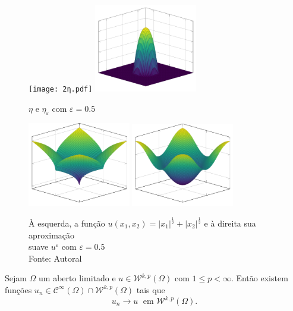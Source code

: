 \documentclass[a4paper, 11pt]{book}
\theoremstyle{definition}
\newcommand{\cC}{\mathcal{C}}
\newcommand{\cW}{\mathcal{W}}
\begin{document}
\begin{ex}
    \begin{figure}
        \centering
        \texttt{[image: 2η.pdf]}
        \hspace{10mm}
        \includegraphics[width=0.4\textwidth]{2ηε.pdf}
        \caption{$\eta$ e $\eta_\varepsilon$ com $\varepsilon = 0.5$}
        \label{fig:eta-R2}
    \end{figure}

    \begin{figure}
        \centering
        \includegraphics[width=0.4\textwidth]{u.pdf}
        \hspace{10mm}
        \includegraphics[width=0.4\textwidth]{uε.pdf}
        \caption{À esquerda, a função $u(x_1,x_2) = |x_1|^{\frac{1}{2}} + |x_2|^{\frac{1}{2}}$ e à direita sua aproximação\\suave $u^\varepsilon$ com $\varepsilon = 0.5$\\Fonte: Autoral}
        \label{fig:aproximacao-suave-R2}
    \end{figure}
\end{ex}

\begin{tbox}
    Sejam $\Omega$ um aberto limitado e $u \in \cW^{k,p}(\Omega)$ com $1 \leqslant p < \infty$.
    Então existem funções $u_n \in \cC^{\infty}(\Omega) \cap \cW^{k,p}(\Omega)$ tais que
    \[
        u_n \to u \;\text{ em } \cW^{k,p}(\Omega).
    \] 
\end{tbox}
\begin{prf}
    
\end{prf}
\end{document}

